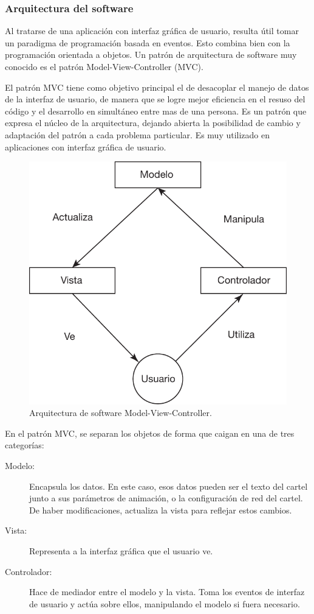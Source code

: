 \subsubsection{Arquitectura del software}
Al tratarse de una aplicación con interfaz gráfica de usuario, resulta útil tomar un paradigma de programación basada en eventos. Esto combina bien con la programación orientada a objetos. Un patrón de arquitectura de software muy conocido es el patrón Model-View-Controller (MVC).

El patrón MVC \cite{MVC} tiene como objetivo principal el de desacoplar el manejo de datos de la interfaz de usuario, de manera que se logre mejor eficiencia en el resuso del código y el desarrollo en simultáneo entre mas de una persona. Es un patrón que expresa el núcleo de la arquitectura, dejando abierta la posibilidad de cambio y adaptación del patrón a cada problema particular. Es muy utilizado en aplicaciones con interfaz gráfica de usuario.

\begin{figure} [h!]
	\centering
	\includegraphics[scale=0.8]{imagenes/mvc.pdf}
	\caption{Arquitectura de software Model-View-Controller.}
	\label{fig:mvc}
\end{figure}

En el patrón MVC, se separan los objetos de forma que caigan en una de tres categorías:
\begin{description}
	\item[Modelo: ] Encapsula los datos. En este caso, esos datos pueden ser el texto del cartel junto a sus parámetros de animación, o la configuración de red del cartel. De haber modificaciones, actualiza la vista para reflejar estos cambios.
	\item[Vista: ] Representa a la interfaz gráfica que el usuario ve.
	\item[Controlador: ] Hace de mediador entre el modelo y la vista. Toma los eventos de interfaz de usuario y actúa sobre ellos, manipulando el modelo si fuera necesario.
\end{description}

